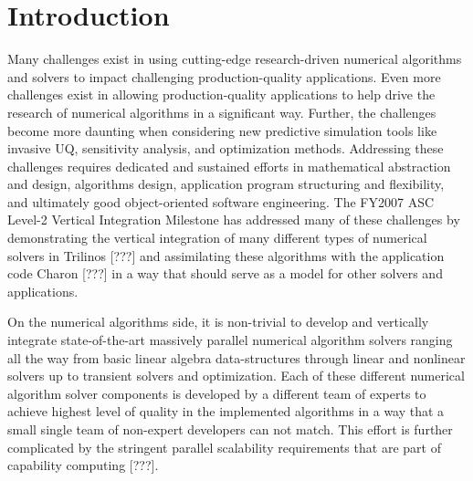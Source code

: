 \documentclass[pdf,ps2pdf,11pt]{SANDreport}
\begin{document}

%
\SANDmain %


%
\section{Introduction}
%

Many challenges exist in using cutting-edge research-driven numerical
algorithms and solvers to impact challenging production-quality applications.
Even more challenges exist in allowing production-quality applications to help
drive the research of numerical algorithms in a significant way.  Further,
the challenges become more daunting when considering new predictive simulation
tools like invasive UQ, sensitivity analysis, and optimization methods.
Addressing these challenges requires dedicated and sustained efforts in
mathematical abstraction and design, algorithms design, application program
structuring and flexibility, and ultimately good object-oriented software
engineering.  The FY2007 ASC Level-2 Vertical Integration Milestone has
addressed many of these challenges by demonstrating the vertical integration
of many different types of numerical solvers in Trilinos [???] and
assimilating these algorithms with the application code Charon [???] in a way
that should serve as a model for other solvers and applications.

On the numerical algorithms side, it is non-trivial to develop and vertically
integrate state-of-the-art massively parallel numerical algorithm solvers
ranging all the way from basic linear algebra data-structures through linear
and nonlinear solvers up to transient solvers and optimization.  Each of these
different numerical algorithm solver components is developed by a different
team of experts to achieve highest level of quality in the implemented
algorithms in a way that a small single team of non-expert developers can not
match.  This effort is further complicated by the stringent parallel
scalability requirements that are part of capability computing [???].
\end{document}

